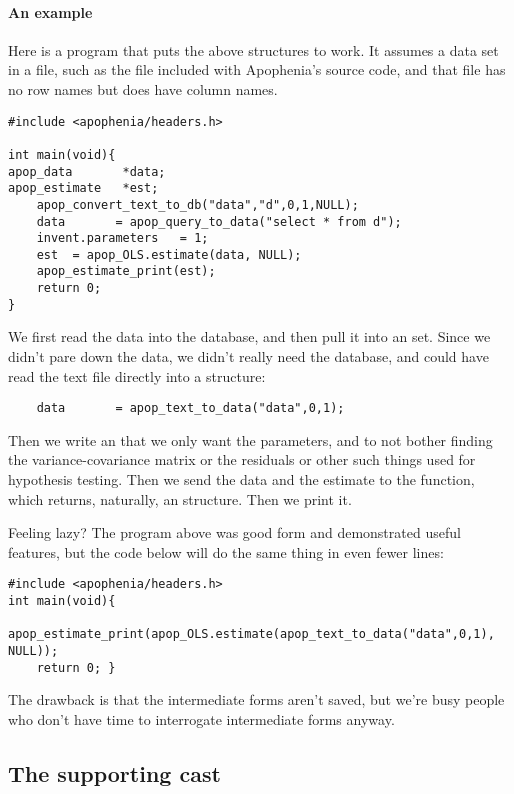 \paragraph{An example}
Here is a program that puts the above structures to work.  It assumes a
data set in a file, such as the  file included with
Apophenia's source code, and that file has no row names but does have
column names.
\begin{lstlisting}
#include <apophenia/headers.h>

int main(void){
apop_data       *data;
apop_estimate   *est;
    apop_convert_text_to_db("data","d",0,1,NULL);
    data       = apop_query_to_data("select * from d");
    invent.parameters   = 1;
    est  = apop_OLS.estimate(data, NULL);
    apop_estimate_print(est);
    return 0;
}
\end{lstlisting}

We first read the data into the database, and then pull it into an  set. Since we didn't pare down the data, we didn't really
need the database, and could have read the text file directly into a
 structure:
\begin{lstlisting}
    data       = apop_text_to_data("data",0,1);
\end{lstlisting}
Then we write an  that we only want the
parameters, and to not bother finding the variance-covariance matrix or
the residuals or other such things used for hypothesis testing. Then we
send the data and the estimate to the 
function, which returns, naturally, an 
structure. Then we print it.

Feeling lazy? The program above was good form and demonstrated useful
features, but the code below will do the same thing in even fewer lines:

\label{oneliner}
\begin{lstlisting}
#include <apophenia/headers.h>
int main(void){
    apop_estimate_print(apop_OLS.estimate(apop_text_to_data("data",0,1), NULL));
    return 0; }
\end{lstlisting}

The drawback is that the intermediate forms aren't saved, but we're busy
people who don't have time to interrogate intermediate forms anyway.

\subsection{The supporting cast}
